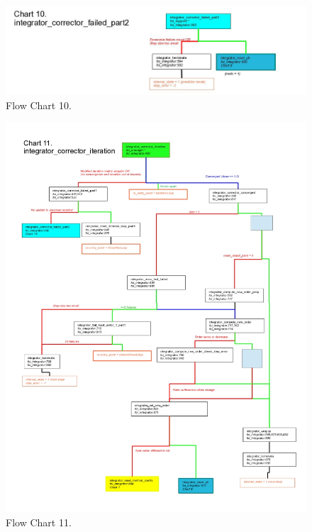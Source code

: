 \begin{figure}[htp]
\begin{center}
\includegraphics[width=6.5in]{figures/lsode_flow10.jpg}
\caption{Flow Chart 10.}
\end{center}
\end{figure}

\begin{figure}[htp]
\begin{center}
\includegraphics[width=6.5in]{figures/lsode_flow11.jpg}
\caption{Flow Chart 11.}
\end{center}
\end{figure}

